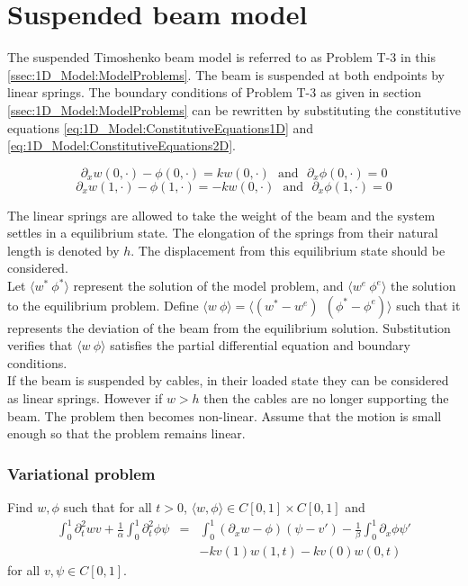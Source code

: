 \documentclass[../../main.tex]{subfiles}
\begin{document}
\setcounter{chapter}{4}
\section{Suspended beam model}
The suspended Timoshenko beam model is referred to as Problem T-3 in this \ref{ssec:1D_Model:ModelProblems}. The beam is suspended at both endpoints by linear springs. The boundary conditions of Problem T-3 as given in section \ref{ssec:1D_Model:ModelProblems} can be rewritten by substituting the constitutive equations \eqref{eq:1D_Model:ConstitutiveEquations1D} and \eqref{eq:1D_Model:ConstitutiveEquations2D}.

	\[\partial_{x}w(0,\cdot) - \phi(0,\cdot) = kw(0,\cdot)  \ \ \ \textrm{and} \ \ \ \partial_{x}\phi(0,\cdot) = 0\]
	\[\partial_{x}w(1,\cdot) - \phi(1,\cdot) = -kw(0,\cdot) \ \  \ \textrm{and} \ \ \ \partial_{x}\phi(1,\cdot) = 0\]
	


The linear springs are allowed to take the weight of the beam and the system settles in a equilibrium state. The elongation of the springs from their natural length is denoted by $h$. The displacement from this equilibrium state should be considered.\\ 

Let $\langle w^* \ \phi^*\rangle$ represent the solution of the model problem, and $\langle w^e \ \phi^e \rangle$ the solution to the equilibrium problem. Define $\langle w \ \phi\rangle = \langle(w^*-w^e) \ \ (\phi^*-\phi^e)\rangle$ such that it represents the deviation of the beam from the equilibrium solution. Substitution verifies that $\langle w \ \phi\rangle$ satisfies the partial differential equation and boundary conditions.\\

If the beam is suspended by cables, in their loaded state they can be considered as linear springs. However if $w > h$ then the cables are no longer supporting the beam. The problem then becomes non-linear. Assume that the motion is small enough so that the problem remains linear.

\subsubsection{Variational problem}
Find $w,\phi$ such that for all $t>0$, $\langle w,\phi \rangle \in C[0,1]\times C[0,1]$ and
\begin{eqnarray*}
	\int_{0}^{1} \partial_{t}^{2} wv + \frac{1}{\alpha}\int_{0}^{1}  \partial_{t}^{2} \phi \psi &=& \int_{0}^{1} (\partial_{x}w - \phi)(\psi -v')  - \frac{1}{\beta}\int_{0}^{1}\partial_{x}\phi \psi'\\
	& & - kv(1)w(1,t) - kv(0)w(0,t)
\end{eqnarray*} for all $v,\psi \in C[0,1]$.\\
\end{document}
